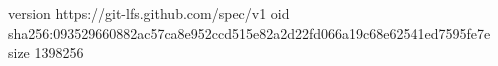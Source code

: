 version https://git-lfs.github.com/spec/v1
oid sha256:093529660882ac57ca8e952ccd515e82a2d22fd066a19c68e62541ed7595fe7e
size 1398256
